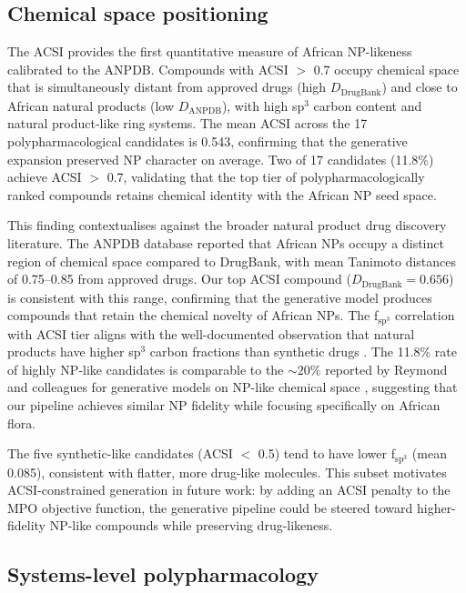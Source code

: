 \documentclass[11pt,a4paper]{article}
\begin{document}
\subsection{Chemical space positioning}

The ACSI provides the first quantitative measure of African NP-likeness calibrated to the ANPDB. Compounds with ACSI $>$ 0.7 occupy chemical space that is simultaneously distant from approved drugs (high $D_{\mathrm{DrugBank}}$) and close to African natural products (low $D_{\mathrm{ANPDB}}$), with high sp$^3$ carbon content and natural product-like ring systems. The mean ACSI across the 17 polypharmacological candidates is 0.543, confirming that the generative expansion preserved NP character on average. Two of 17 candidates (11.8\%) achieve ACSI $>$ 0.7, validating that the top tier of polypharmacologically ranked compounds retains chemical identity with the African NP seed space.

This finding contextualises against the broader natural product drug discovery literature. The ANPDB database \citep{anpdb_2026} reported that African NPs occupy a distinct region of chemical space compared to DrugBank, with mean Tanimoto distances of 0.75--0.85 from approved drugs. Our top ACSI compound ($D_{\mathrm{DrugBank}} = 0.656$) is consistent with this range, confirming that the generative model produces compounds that retain the chemical novelty of African NPs. The f$_{\mathrm{sp}^3}$ correlation with ACSI tier aligns with the well-documented observation that natural products have higher sp$^3$ carbon fractions than synthetic drugs \citep{value_addition_african_np_2025}. The 11.8\% rate of highly NP-like candidates is comparable to the $\sim 20\%$ reported by Reymond and colleagues for generative models on NP-like chemical space \citep{reymond_2021}, suggesting that our pipeline achieves similar NP fidelity while focusing specifically on African flora.

The five synthetic-like candidates (ACSI $<$ 0.5) tend to have lower f$_{\mathrm{sp}^3}$ (mean 0.085), consistent with flatter, more drug-like molecules. This subset motivates ACSI-constrained generation in future work: by adding an ACSI penalty to the MPO objective function, the generative pipeline could be steered toward higher-fidelity NP-like compounds while preserving drug-likeness.

\subsection{Systems-level polypharmacology}
\end{document}
